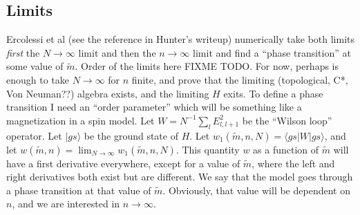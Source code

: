 	\subsection{Limits}
	Ercolessi et al (see the reference in Hunter's writeup) numerically take both limits \emph{first} the $N\rightarrow\infty$ limit
   and then the $n\rightarrow\infty$ limit and find a ``phase transition'' at some value of $\tilde{m}$. Order of the limits here FIXME TODO.
	For now, perhaps is enough to take $N\rightarrow\infty$ for $n$ finite, and prove that the limiting (topological, C*, Von Neuman??)
	algebra exists, and the limiting $H$ exits.
	To define a phase transition I need an ``order parameter'' which will be something like a magnetization in a spin model.
	Let $W=N^{-1}\sum_l E_{l, l+1}^2$ be the ``Wilson loop'' operator. Let $|gs\rangle$ be the ground state of $H$.
	Let $w_1(\tilde{m}, n, N) = \langle gs | W |gs\rangle$, and let $w(\tilde{m}, n)=\lim_{N\rightarrow\infty} w_1(\tilde{m}, n, N)$.
	 This quantity $w$ as a function of $\tilde{m}$ will have a first derivative everywhere,
	except for a value of $\tilde{m}$, where the left and right derivatives both exist but are different.
	We say that the model goes through a phase transition at that value of $\tilde{m}$. Obviously, that value will be dependent on $n$,
	and we are interested in $n\rightarrow\infty$.
	
%
